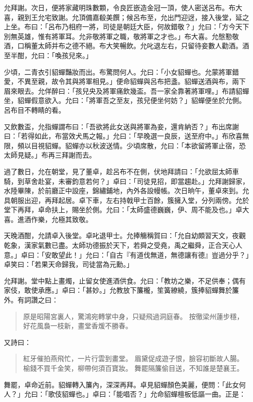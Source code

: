 允拜謝。次日，便將家藏明珠數顆，令良匠嵌造金冠一頂，使人密送呂布。布大喜，親到王允宅致謝。允頂備嘉殽美饌；候呂布至，允出門迎迓，接入後堂，延之上坐。布曰：「呂布乃相府一將，司徒是朝廷大臣，何故錯敬？」允曰：「方今天下別無英雄，惟有將軍耳。允非敬將軍之職，敬將軍之才也。」布大喜。允慇懃敬酒，口稱董太師并布之德不絕。布大笑暢飲。允叱退左右，只留待妾數人勸酒。酒至半酣，允曰：「喚孩兒來。」

少頃，二青衣引貂蟬豔妝而出。布驚問何人。允曰：「小女貂蟬也。允蒙將軍錯愛，不異至親，故令其與將軍相見。」便命貂蟬與呂布把盞。貂蟬送酒與布，兩下眉來眼去。允佯醉曰：「孩兒央及將軍痛飲幾盃。吾一家全靠著將軍哩。」布請貂蟬坐，貂蟬假意欲入。允曰：「將軍吾之至友，孩兒便坐何妨？」貂蟬便坐於允側。呂布目不轉睛的看。

又飲數盃，允指蟬謂布曰：「吾欲將此女送與將軍為妾，還肯納否？」布出席謝曰：「若得如此，布當效犬馬之報。」允曰：「早晚選一良辰，送至府中。」布欣喜無限，頻以目視貂蟬。貂蟬亦以秋波送情。少頃席散，允曰：「本欲留將軍止宿，恐太師見疑。」布再三拜謝而去。

過了數日，允在朝堂，見了董卓，趁呂布不在側，伏地拜請曰：「允欲屈太師車騎，到草舍赴宴，未審鈞意若何？」卓曰：「司徒見招，即當趨赴。」允拜謝歸家，水陸畢陳，於前廳正中設座，錦繡鋪地，內外各設幔帳。次日晌午，董卓來到。允具朝服出迎，再拜起居。卓下車，左右持戟甲士百餘，簇擁入堂，分列兩傍。允於堂下再拜，卓命扶上，賜坐於側。允曰：「太師盛德巍巍，伊、周不能及也。」卓大喜。進酒作樂，允極其致敬。

天晚酒酣，允請卓入後堂。卓叱退甲士。允捧觴稱賀曰：「允自幼頗習天文，夜觀乾象，漢家氣數已盡。太師功德振於天下，若舜之受堯，禹之繼舜，正合天心人意。」卓曰：「安敢望此！」允曰：「自古『有道伐無道，無德讓有德』豈過分乎？」卓笑曰：「若果天命歸我，司徒當為元勳。」

允拜謝。堂中點上畫燭，止留女使進酒供食。允曰：「教坊之樂，不足供奉；偶有家伎，敢使承應。」卓曰：「甚妙。」允教放下簾櫳，笙簧繚繞，簇捧貂蟬舞於簾外。有詞讚之曰：

\begin{quote}
原是昭陽宮裏人，驚鴻宛轉掌中身，只疑飛過洞庭春。
按徹梁州蓮步穩，好花風裊一枝新，畫堂香煖不勝春。
\end{quote}

又詩曰：

\begin{quote}
紅牙催拍燕飛忙，一片行雲到畫堂。
眉黛促成遊子恨，臉容初斷故人腸。
榆錢不買千金笑，柳帶何須百寶妝。
舞罷隔簾偷目送，不知誰是楚襄王。
\end{quote}

舞罷，卓命近前。貂蟬轉入簾內，深深再拜。卓見貂蟬顏色美麗，便問：「此女何人？」允曰：「歌伎貂蟬也。」卓曰：「能唱否？」允命貂蟬檀板低謳一曲。正是：


